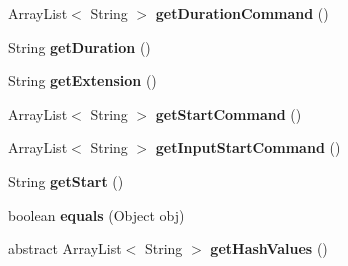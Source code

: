 \begin{DoxyCompactItemize}
\item 
\hypertarget{classvideo_1_1_profile_ad9033fca02cf6eac9c4548364530fdb7}{
ArrayList$<$ String $>$ {\bfseries getDurationCommand} ()}
\label{classvideo_1_1_profile_ad9033fca02cf6eac9c4548364530fdb7}

\item 
\hypertarget{classvideo_1_1_profile_a2f3d7bc049b32a00480cda415970bbeb}{
String {\bfseries getDuration} ()}
\label{classvideo_1_1_profile_a2f3d7bc049b32a00480cda415970bbeb}

\item 
\hypertarget{classvideo_1_1_profile_a944ed8d8a43b3a520f6a869744c93911}{
String {\bfseries getExtension} ()}
\label{classvideo_1_1_profile_a944ed8d8a43b3a520f6a869744c93911}

\item 
\hypertarget{classvideo_1_1_profile_a378d8b6a9e694eb8051444a86ff7cad6}{
ArrayList$<$ String $>$ {\bfseries getStartCommand} ()}
\label{classvideo_1_1_profile_a378d8b6a9e694eb8051444a86ff7cad6}

\item 
\hypertarget{classvideo_1_1_profile_ae07aec7f4a871628fec90c056cf22638}{
ArrayList$<$ String $>$ {\bfseries getInputStartCommand} ()}
\label{classvideo_1_1_profile_ae07aec7f4a871628fec90c056cf22638}

\item 
\hypertarget{classvideo_1_1_profile_ab5ed488fda54be68089310b63b854807}{
String {\bfseries getStart} ()}
\label{classvideo_1_1_profile_ab5ed488fda54be68089310b63b854807}

\item 
\hypertarget{classvideo_1_1_profile_ae8256f1d4879880a5e0557cbfff13237}{
boolean {\bfseries equals} (Object obj)}
\label{classvideo_1_1_profile_ae8256f1d4879880a5e0557cbfff13237}

\item 
\hypertarget{classvideo_1_1_profile_a6d6c49fde96388b672b165cce3fb0ebd}{
abstract ArrayList$<$ String $>$ {\bfseries getHashValues} ()}
\label{classvideo_1_1_profile_a6d6c49fde96388b672b165cce3fb0ebd}

\end{DoxyCompactItemize}
